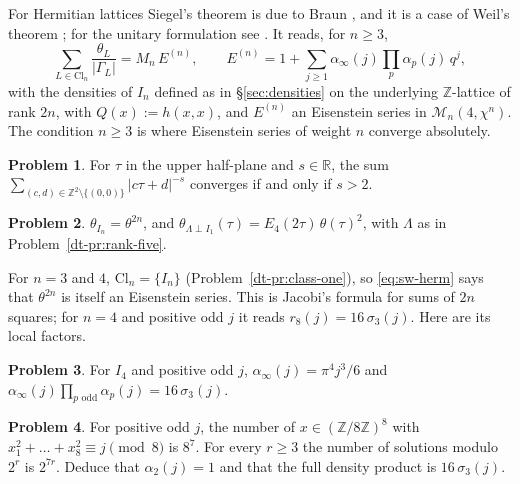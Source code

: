 \documentclass[reqno]{amsart}
\theoremstyle{definition}
\newtheorem{problem}{Problem}[section]
\theoremstyle{plain}
\newcommand{\Z}{\mathbb{Z}}
\newcommand{\R}{\mathbb{R}}
\newcommand{\Mf}{\mathcal{M}}
\newcommand{\Cl}{\mathrm{Cl}}
\begin{document}
For Hermitian lattices Siegel's theorem is due to Braun \cite{Br}, and it is a case of Weil's theorem \cite[Theorem~5]{We65}; for the unitary formulation see \cite[Theorem~2.3.1]{Li24}.  It reads, for \(n \ge 3\),
\begin{equation}\label{eq:sw-herm}
  \sum_{L \in \Cl_n} \frac{\theta_L}{\lvert \Gamma_L\rvert} = M_n\, E^{(n)}, \qquad E^{(n)} = 1 + \sum_{j \ge 1} \alpha_\infty(j)\prod_p \alpha_p(j)\, q^j ,
\end{equation}
with the densities of \(I_n\) defined as in \S\ref{sec:densities} on the underlying \(\Z\)-lattice of rank \(2n\), with \(Q(x) := h(x,x)\), and \(E^{(n)}\) an Eisenstein series in \(\Mf_n(4,\chi^n)\).  The condition \(n \ge 3\) is where Eisenstein series of weight \(n\) converge absolutely.

\begin{problem}\label{pr:converge}
For \(\tau\) in the upper half-plane and \(s\in\R\), the sum \(\sum_{(c,d)\in\Z^2\setminus\{(0,0)\}}\lvert c\tau+d\rvert^{-s}\) converges if and only if \(s>2\).
\end{problem}

\begin{problem}\label{pr:theta-L}
\(\theta_{I_n} = \theta^{2n}\), and \(\theta_{\Lambda \perp I_1}(\tau) = E_4(2\tau)\,\theta(\tau)^2\), with \(\Lambda\) as in Problem~\ref{dt-pr:rank-five}.
\end{problem}

For \(n = 3\) and \(4\), \(\Cl_n = \{I_n\}\) (Problem~\ref{dt-pr:class-one}), so \eqref{eq:sw-herm} says that \(\theta^{2n}\) is itself an Eisenstein series.  This is Jacobi's formula for sums of \(2n\) squares; for \(n = 4\) and positive odd \(j\) it reads \(r_8(j) = 16\,\sigma_3(j)\).  Here are its local factors.

\begin{problem}\label{pr:r8-odd}
For \(I_4\) and positive odd \(j\), \(\alpha_\infty(j) = \pi^4j^3/6\) and \(\alpha_\infty(j)\prod_{p \text{ odd}}\alpha_p(j) = 16\,\sigma_3(j)\).
\end{problem}

\begin{problem}\label{pr:mod8}
For positive odd \(j\), the number of \(x \in (\Z/8\Z)^8\) with \(x_1^2 + \dots + x_8^2 \equiv j \pmod 8\) is \(8^7\).  For every \(r\ge3\) the number of solutions modulo \(2^r\) is \(2^{7r}\).  Deduce that \(\alpha_2(j)=1\) and that the full density product is \(16\,\sigma_3(j)\).
\end{problem}
\end{document}
